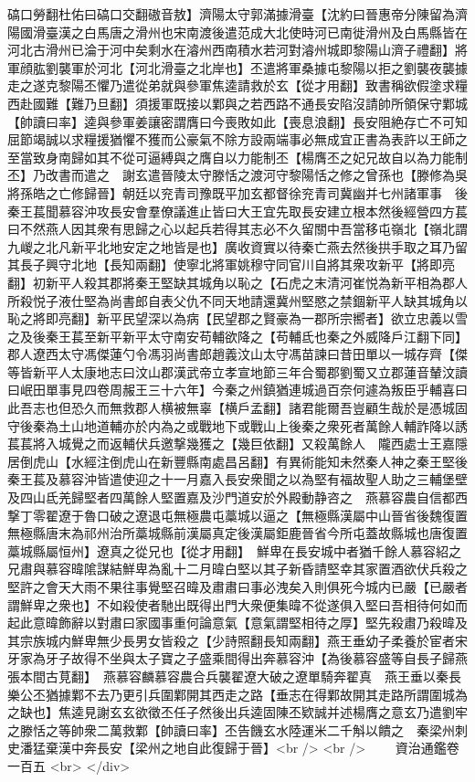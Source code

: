 碻口勞翻杜佑曰碻口交翻磝音敖】濟陽太守郭滿據滑臺【沈約曰晉惠帝分陳留為濟陽國滑臺漢之白馬唐之滑州也宋南渡後遣范成大北使時河已南徙滑州及白馬縣皆在河北古滑州已淪于河中矣剩水在濬州西南積水若河對濬州城即黎陽山濟子禮翻】將軍顔肱劉襲軍於河北【河北滑臺之北岸也】丕遣將軍桑據屯黎陽以拒之劉襲夜襲據走之遂克黎陽丕懼乃遣從弟就與參軍焦逵請救於玄【從才用翻】致書稱欲假塗求糧西赴國難【難乃旦翻】須援軍既接以鄴與之若西路不通長安陷沒請帥所領保守鄴城【帥讀曰率】逵與參軍姜讓密謂膺曰今喪敗如此【喪息浪翻】長安阻絶存亡不可知屈節竭誠以求糧援猶懼不獲而公豪氣不除方設兩端事必無成宜正書為表許以王師之至當致身南歸如其不從可逼縛與之膺自以力能制丕【楊膺丕之妃兄故自以為力能制丕】乃改書而遣之　謝玄遣晉陵太守滕恬之渡河守黎陽恬之修之曾孫也【滕修為吳將孫皓之亡修歸晉】朝廷以兖青司豫既平加玄都督徐兖青司冀幽并七州諸軍事　後秦王萇聞慕容沖攻長安會羣僚議進止皆曰大王宜先取長安建立根本然後經營四方萇曰不然燕人因其衆有思歸之心以起兵若得其志必不久留關中吾當移屯嶺北【嶺北謂九嵕之北凡新平北地安定之地皆是也】廣收資實以待秦亡燕去然後拱手取之耳乃留其長子興守北地【長知兩翻】使寧北將軍姚穆守同官川自將其衆攻新平【將即亮翻】初新平人殺其郡將秦王堅缺其城角以恥之【石虎之末清河崔悦為新平相為郡人所殺悦子液仕堅為尚書郎自表父仇不同天地請還冀州堅愍之禁錮新平人缺其城角以恥之將即亮翻】新平民望深以為病【民望郡之賢豪為一郡所宗嚮者】欲立忠義以雪之及後秦王萇至新平新平太守南安苟輔欲降之【苟輔氐也秦之外威降戶江翻下同】郡人遼西太守馮傑蓮勺令馮羽尚書郎趙義汶山太守馮苗諫曰昔田單以一城存齊【傑等皆新平人太康地志曰汶山郡漢武帝立孝宣地節三年合蜀郡劉蜀又立郡蓮音輦汶讀曰岷田單事見四卷周赧王三十六年】今秦之州鎮猶連城過百奈何遽為叛臣乎輔喜曰此吾志也但恐久而無救郡人横被無辜【横戶孟翻】諸君能爾吾豈顧生哉於是憑城固守後秦為土山地道輔亦於内為之或戰地下或戰山上後秦之衆死者萬餘人輔詐降以誘萇萇將入城覺之而返輔伏兵邀撃幾獲之【幾巨依翻】又殺萬餘人　隴西處士王嘉隱居倒虎山【水經注倒虎山在新豐縣南處昌呂翻】有異術能知未然秦人神之秦王堅後秦王萇及慕容沖皆遣使迎之十一月嘉入長安衆聞之以為堅有福故聖人助之三輔堡壁及四山氐羌歸堅者四萬餘人堅置嘉及沙門道安於外殿動静咨之　燕慕容農自信都西撃丁零翟遼于魯口破之遼退屯無極農屯藁城以逼之【無極縣漢屬中山晉省後魏復置無極縣唐末為祁州治所藁城縣前漢屬真定後漢屬鉅鹿晉省今所屯蓋故縣城也唐復置藁城縣屬恒州】遼真之從兄也【從才用翻】　鮮卑在長安城中者猶千餘人慕容紹之兄肅與慕容暐隂謀結鮮卑為亂十二月暐白堅以其子新昏請堅幸其家置酒欲伏兵殺之堅許之會天大雨不果往事覺堅召暐及肅肅曰事必洩矣入則俱死今城内已嚴【已嚴者謂鮮卑之衆也】不如殺使者馳出既得出門大衆便集暐不從遂俱入堅曰吾相待何如而起此意暐飾辭以對肅曰家國事重何論意氣【意氣謂堅相待之厚】堅先殺肅乃殺暐及其宗族城内鮮卑無少長男女皆殺之【少詩照翻長知兩翻】燕王垂幼子柔養於宦者宋牙家為牙子故得不坐與太子寶之子盛乘間得出奔慕容沖【為後慕容盛等自長子歸燕張本間古莧翻】　燕慕容麟慕容農合兵襲翟遼大破之遼單騎奔翟真　燕王垂以秦長樂公丕猶據鄴不去乃更引兵圍鄴開其西走之路【垂志在得鄴故開其走路所謂圍城為之缺也】焦逵見謝玄玄欲徵丕任子然後出兵逵固陳丕欵誠并述楊膺之意玄乃遣劉牢之滕恬之等帥衆二萬救鄴【帥讀曰率】丕告饑玄水陸運米二千斛以饋之　秦梁州刺史潘猛棄漢中奔長安【梁州之地自此復歸于晉】<br />
<br />
　　資治通鑑卷一百五  <br>
   </div> 

